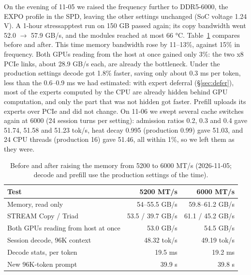 \documentclass[11pt,a4paper]{article}
\newcommand{\tps}{tok/s}
\begin{document}
On the evening of 11-05 we raised the frequency further to DDR5-6000, the EXPO profile in the SPD, leaving the other settings unchanged (SoC voltage 1.24 V). A 1-hour stressapptest run on 150 GB passed again; its copy bandwidth went 52.0 $\to$ 57.9 GB/s, and the modules reached at most 66 °C. Table~\ref{tab:ddr6000} compares before and after. This time memory bandwidth rose by 11--13\%, against 15\% in frequency. Both GPUs reading from the host at once gained only 3\%: the two x8 PCIe links, about 28.9 GB/s each, are already the bottleneck. Under the production settings decode got 1.8\% faster, saving only about 0.3 ms per token, less than the 0.6--0.9 ms we had estimated: with expert deferral (\S\ref{sec:defer}), most of the experts computed by the CPU are already hidden behind GPU computation, and only the part that was not hidden got faster. Prefill uploads its experts over PCIe and did not change. On 11-06 we swept several cache switches again at 6000 (24 session turns per setting): admission ratios 0.2, 0.3 and 0.4 gave 51.74, 51.58 and 51.23 \tps{}, heat decay 0.995 (production 0.99) gave 51.03, and 24 CPU threads (production 16) gave 51.46, all within 1\%, so we left them as they were.

\begin{table}[h]
  \centering
  \small
  \caption{Before and after raising the memory from 5200 to 6000 MT/s (2026-11-05; decode and prefill use the production settings of the time).}
  \label{tab:ddr6000}
  \begin{tabular}{@{}l r r@{}}
    \toprule
    Test & 5200 MT/s & 6000 MT/s \\
    \midrule
    Memory, read only & 54--55.5 GB/s & 59.8--61.2 GB/s \\
    STREAM Copy / Triad & 53.5 / 39.7 GB/s & 61.1 / 45.2 GB/s \\
    Both GPUs reading from host at once & 53.0 GB/s & 54.5 GB/s \\
    Session decode, 96K context & 48.32 \tps{} & 49.19 \tps{} \\
    Decode stats, per token & 19.5 ms & 19.2 ms \\
    New 96K-token prompt & 39.9 s & 39.8 s \\
    \bottomrule
  \end{tabular}
\end{table}
\end{document}
